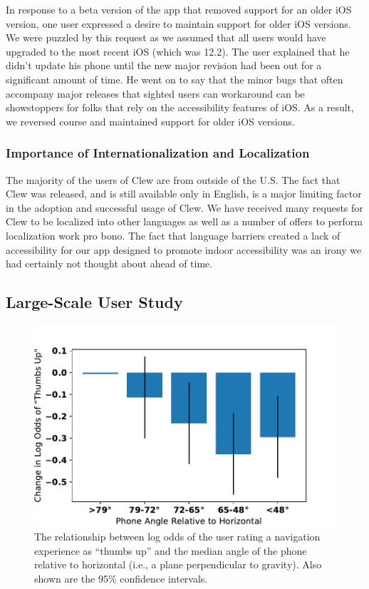 \documentclass[chi_draft]{sigchi}
\begin{document}
In response to a beta version of the app that removed support for an older iOS version, one user expressed a desire to maintain support for older iOS versions.  We were puzzled by this request as we assumed that all users would have upgraded to the most recent iOS (which was 12.2).  The user explained that he didn't update his phone until the new major revision had been out for a significant amount of time.  He went on to say that the minor bugs that often accompany major releases that sighted users can workaround can be showstoppers for folks that rely on the accessibility features of iOS.  As a result, we reversed course and maintained support for older iOS versions.

\subsubsection{Importance of Internationalization and Localization}

The majority of the users of Clew are from outside of the U.S.  The fact that Clew was released, and is still available only in English, is a major limiting factor in the adoption and successful usage of Clew.  We have received many requests for Clew to be localized into other languages as well as a number of offers to perform localization work pro bono.  The fact that language barriers created a lack of accessibility for our app designed to promote indoor accessibility was an irony we had certainly not thought about ahead of time.

\subsection{Large-Scale User Study}\label{sec:largescalestudy}
\begin{figure}
\includegraphics[width=\linewidth]{figures/phoneangle}
\caption{The relationship between log odds of the user rating a navigation experience as ``thumbs up'' and the median angle of the phone relative to horizontal (i.e., a plane perpendicular to gravity).  Also shown are the 95\% confidence intervals.\label{fig:devicepose}}
\end{figure}
\end{document}
